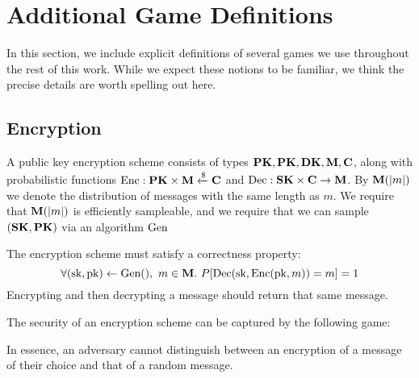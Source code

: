 \section{Additional Game Definitions}

In this section, we include explicit definitions of several games we
use throughout the rest of this work.
While we expect these notions to be familiar, we think the precise
details are worth spelling out here.

\subsection{Encryption}
\label{app:encryption}
A public key encryption scheme consists of types $\textbf{PK}, \textbf{PK}, \textbf{DK}, \textbf{M}, \textbf{C}$,
along with probabilistic functions $\text{Enc} : \textbf{PK} \times \textbf{M} \xleftarrow{\$} \textbf{C}$ and $\text{Dec} : \textbf{SK} \times \textbf{C} \to \textbf{M}$.
By $\textbf{M}(|m|)$ we denote the distribution of messages with the same
length as $m$.
We require that $\textbf{M}(|m|)$ is efficiently sampleable,
and we require that we can sample $(\textbf{SK}, \textbf{PK})$ via an algorithm
$\text{Gen}$

The encryption scheme must satisfy a correctness property:
$$
\forall (\text{sk}, \text{pk}) \gets \text{Gen}(),\ m \in \textbf{M}.\ P[\text{Dec}(\text{sk}, \text{Enc}(\text{pk}, m)) = m] = 1
$$
Encrypting and then decrypting a message should return that same message.

The security of an encryption scheme can be captured by the following game:

In essence, an adversary cannot distinguish between an encryption of a message
of their choice and that of a random message.